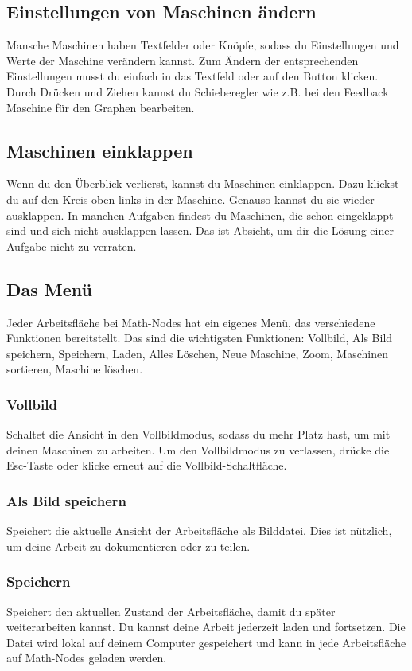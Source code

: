 \documentclass[12pt]{report}
\begin{document}
\subsection{Einstellungen von Maschinen ändern}
Mansche Maschinen haben Textfelder oder Knöpfe, sodass du Einstellungen und Werte der Maschine verändern kannst. Zum Ändern der entsprechenden Einstellungen musst du einfach in das Textfeld oder auf den Button klicken. Durch Drücken und Ziehen kannst du Schieberegler wie z.B. bei den Feedback Maschine für den Graphen bearbeiten. 
\subsection{Maschinen einklappen}
Wenn du den Überblick verlierst, kannst du Maschinen einklappen. Dazu klickst du auf den Kreis oben links in der Maschine. Genauso kannst du sie wieder ausklappen. In manchen Aufgaben findest du Maschinen, die schon eingeklappt sind und sich nicht ausklappen lassen. Das ist Absicht, um dir die Lösung einer Aufgabe nicht zu verraten.

\subsection{Das Menü}
Jeder Arbeitsfläche bei Math-Nodes hat ein eigenes Menü, das verschiedene Funktionen bereitstellt. Das sind die wichtigsten Funktionen: Vollbild, Als Bild speichern, Speichern, Laden, Alles Löschen, Neue Maschine, Zoom, Maschinen sortieren, Maschine löschen.
\subsubsection{Vollbild}
Schaltet die Ansicht in den Vollbildmodus, sodass du mehr Platz hast, um mit deinen Maschinen zu arbeiten. Um den Vollbildmodus zu verlassen, drücke die Esc-Taste oder klicke erneut auf die Vollbild-Schaltfläche.

\subsubsection{Als Bild speichern}
Speichert die aktuelle Ansicht der Arbeitsfläche als Bilddatei. Dies ist nützlich, um deine Arbeit zu dokumentieren oder zu teilen.
\subsubsection{Speichern}
Speichert den aktuellen Zustand der Arbeitsfläche, damit du später weiterarbeiten kannst. Du kannst deine Arbeit jederzeit laden und fortsetzen. Die Datei wird lokal auf deinem Computer gespeichert und kann in jede Arbeitsfläche auf Math-Nodes geladen werden.
\end{document}
